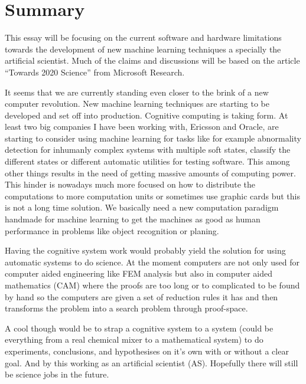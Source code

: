 \documentclass{article}
\begin{document}

\section{Summary}
    This essay will be focusing on the current software and hardware limitations
    towards the development of new machine learning techniques a specially the
    artificial scientist. Much of the claims and discussions will be based on
    the article ``Towards 2020 Science'' from Microsoft Research.\cite{ms2020}

    It seems that we are currently standing even closer to the brink of a new 
    computer revolution. New machine learning techniques are starting to be 
    developed and set off into production. Cognitive computing is taking form.
    At least two big companies I have been working with, Ericsson and Oracle, 
    are starting to consider using machine learning for tasks like for example 
    abnormality detection for inhumanly complex systems with multiple soft
    states, classify the different states or different automatic utilities for
    testing software. This among other things results in the need of getting 
    massive amounts of computing power. This hinder is nowadays much more 
    focused on how to distribute the computations to more computation units or 
    sometimes use graphic cards but this is not a long time solution. We 
    basically need a new computation paradigm handmade for machine learning to 
    get the machines as good as human performance in problems like object 
    recognition or planing.

    Having the cognitive system work would probably yield the solution for
    using automatic systems to do science. At the moment computers are not only
    used for computer aided engineering like FEM analysis but also in computer
    aided mathematics (CAM) where the proofs are too long or to complicated to
    be found by hand so the computers are given a set of reduction rules it has
    and then transforms the problem into a search problem through proof-space.
    
    A cool though would be to strap a cognitive system to a system (could be
    everything from a real chemical mixer to a mathematical system) to do
    experiments, conclusions, and hypothesises on it's own with or without a
    clear goal. And by this working as an artificial scientist (AS). Hopefully
    there will still be science jobs in the future.
    
\end{document}
